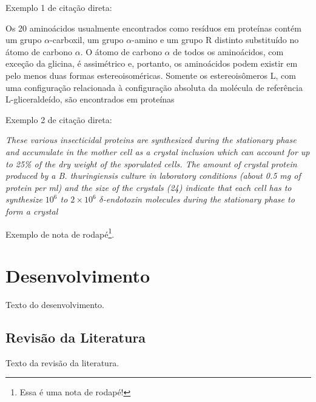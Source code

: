 \documentclass[
	article,			%
	11pt,				%
	oneside,			%
	a4paper,			%
	chapter=TITLE,		%
	section=TITLE,		%
	english,			%
	brazil,				%
	sumario=tradicional
]{abntex2}
\begin{document}
	
	Exemplo 1 de citação direta:
	
	\begin{citacao}
		Os 20 aminoácidos usualmente encontrados como resíduos em proteínas contém um grupo $\alpha$-carboxil, um grupo $\alpha$-amino e um grupo R distinto substituído no átomo de carbono $\alpha$. O átomo de carbono $\alpha$ de todos os aminoácidos, com exceção da glicina, é assimétrico e, portanto, os aminoácidos podem existir em pelo menos duas formas estereoisoméricas. Somente os estereoisômeros L, com uma configuração relacionada à configuração absoluta da molécula de referência L-gliceraldeído, são encontrados em proteínas \cite[p. 81]{Nelson2014}
	\end{citacao}
	
	Exemplo 2 de citação direta:
	
	\begin{citacao}
		\textit{These various insecticidal proteins are synthesized during the stationary phase and accumulate in the mother cell as a crystal inclusion which can account for up to 25\% of the dry weight of the sporulated cells. The amount of crystal protein produced by a B. thuringiensis culture in laboratory conditions (about 0.5 mg of protein per ml) and the size of the crystals (24) indicate that each cell has to synthesize $10^6$ to $2 \times 10^6$ $\delta$-endotoxin molecules during the stationary phase to form a crystal} \cite[p. 1]{Agaisse1995}
	\end{citacao}
	
	Exemplo de nota de rodapé\footnote{Essa é uma nota de rodapé!}.
	
    
    

	\section{Desenvolvimento}
    	
     Texto do desenvolvimento.
     
     
     
     
     \subsection{Revisão da Literatura}
     
     Texto da revisão da literatura.
     
\end{document}
